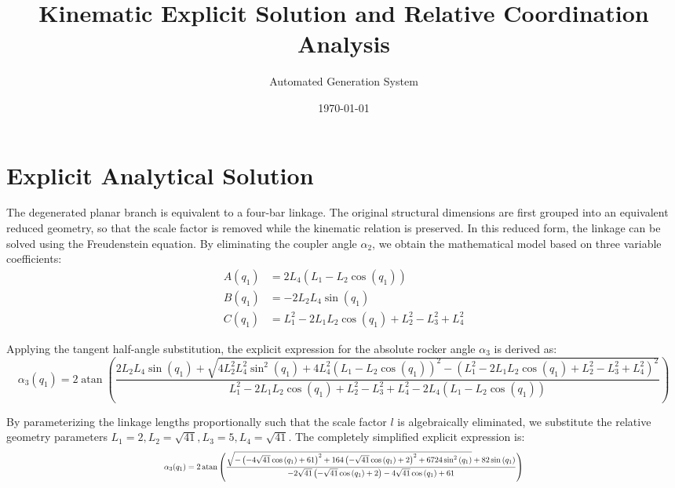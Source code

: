 ﻿\documentclass[12pt,a4paper]{article}
\title{\textbf{Kinematic Explicit Solution and Relative Coordination Analysis}}
\author{Automated Generation System}
\date{\today}
\begin{document}
\maketitle

\section{Explicit Analytical Solution}
The degenerated planar branch is equivalent to a four-bar linkage. The original structural dimensions are first grouped into an equivalent reduced geometry, so that the scale factor is removed while the kinematic relation is preserved. In this reduced form, the linkage can be solved using the Freudenstein equation. By eliminating the coupler angle $\alpha_2$, we obtain the mathematical model based on three variable coefficients:
\begin{align}
    A(q_1) &= 2 L_{4} \left(L_{1} - L_{2} \cos{\left(q_{1} \right)}\right) \\
    B(q_1) &= - 2 L_{2} L_{4} \sin{\left(q_{1} \right)} \\
    C(q_1) &= L_{1}^{2} - 2 L_{1} L_{2} \cos{\left(q_{1} \right)} + L_{2}^{2} - L_{3}^{2} + L_{4}^{2}
\end{align}

Applying the tangent half-angle substitution, the explicit expression for the absolute rocker angle $\alpha_3$ is derived as:
\begin{equation}
    \alpha_3(q_1) = 2 \operatorname{atan}{\left(\frac{2 L_{2} L_{4} \sin{\left(q_{1} \right)} + \sqrt{4 L_{2}^{2} L_{4}^{2} \sin^{2}{\left(q_{1} \right)} + 4 L_{4}^{2} \left(L_{1} - L_{2} \cos{\left(q_{1} \right)}\right)^{2} - \left(L_{1}^{2} - 2 L_{1} L_{2} \cos{\left(q_{1} \right)} + L_{2}^{2} - L_{3}^{2} + L_{4}^{2}\right)^{2}}}{L_{1}^{2} - 2 L_{1} L_{2} \cos{\left(q_{1} \right)} + L_{2}^{2} - L_{3}^{2} + L_{4}^{2} - 2 L_{4} \left(L_{1} - L_{2} \cos{\left(q_{1} \right)}\right)} \right)}
\end{equation}

By parameterizing the linkage lengths proportionally such that the scale factor $l$ is algebraically eliminated, we substitute the relative geometry parameters $L_1=2, L_2=\sqrt{41}, L_3=5, L_4=\sqrt{41}$. The completely simplified explicit expression is:
\begin{equation}
    \resizebox{0.95\linewidth}{!}{$\displaystyle \alpha_3(q_1) = 2 \operatorname{atan}{\left(\frac{\sqrt{- \left(- 4 \sqrt{41} \cos{\left(q_{1} \right)} + 61\right)^{2} + 164 \left(- \sqrt{41} \cos{\left(q_{1} \right)} + 2\right)^{2} + 6724 \sin^{2}{\left(q_{1} \right)}} + 82 \sin{\left(q_{1} \right)}}{- 2 \sqrt{41} \left(- \sqrt{41} \cos{\left(q_{1} \right)} + 2\right) - 4 \sqrt{41} \cos{\left(q_{1} \right)} + 61} \right)} $}
\end{equation}
\end{document}
